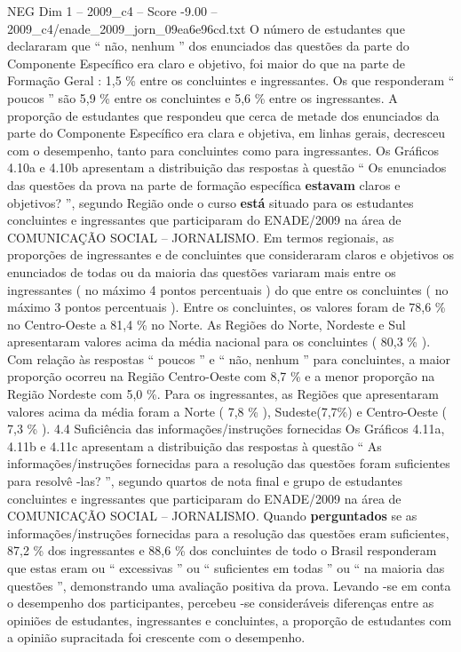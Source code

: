 \begin{textsample}{NEG Dim 1 – 2009\_c4 – Score -9.00 – 2009\_c4/enade\_2009\_jorn\_09ea6e96cd.txt}
O número de estudantes que declararam que “ não, nenhum ” dos enunciados das questões da parte do Componente Específico era claro e objetivo, foi maior do que na parte de Formação Geral : 1,5 \% entre os concluintes e ingressantes.
Os que responderam “ poucos ” são 5,9 \% entre os concluintes e 5,6 \% entre os ingressantes.
A proporção de estudantes que respondeu que cerca de metade dos enunciados da parte do Componente Específico era clara e objetiva, em linhas gerais, decresceu com o desempenho, tanto para concluintes como para ingressantes.
Os Gráficos 4.10a e 4.10b apresentam a distribuição das respostas à questão “ Os enunciados das questões da prova na parte de formação específica \textbf{estavam} claros e objetivos? ”, segundo Região onde o curso \textbf{está} situado para os estudantes concluintes e ingressantes que participaram do ENADE/2009 na área de COMUNICAÇÃO SOCIAL – JORNALISMO.
Em termos regionais, as proporções de ingressantes e de concluintes que consideraram claros e objetivos os enunciados de todas ou da maioria das questões variaram mais entre os ingressantes ( no máximo 4 pontos percentuais ) do que entre os concluintes ( no máximo 3 pontos percentuais ).
Entre os concluintes, os valores foram de 78,6 \% no Centro-Oeste a 81,4 \% no Norte.
As Regiões do Norte, Nordeste e Sul apresentaram valores acima da média nacional para os concluintes ( 80,3 \% ).
Com relação às respostas “ poucos ” e “ não, nenhum ” para concluintes, a maior proporção ocorreu na Região Centro-Oeste com 8,7 \% e a menor proporção na Região Nordeste com 5,0 \%.
Para os ingressantes, as Regiões que apresentaram valores acima da média foram a Norte ( 7,8 \% ), Sudeste(7,7\%) e Centro-Oeste ( 7,3 \% ). 4.4 Suficiência das informações/instruções fornecidas Os Gráficos 4.11a, 4.11b e 4.11c apresentam a distribuição das respostas à questão “ As informações/instruções fornecidas para a resolução das questões foram suficientes para resolvê -las? ”, segundo quartos de nota final e grupo de estudantes concluintes e ingressantes que participaram do ENADE/2009 na área de COMUNICAÇÃO SOCIAL – JORNALISMO.
Quando \textbf{perguntados} se as informações/instruções fornecidas para a resolução das questões eram suficientes, 87,2 \% dos ingressantes e 88,6 \% dos concluintes de todo o Brasil responderam que estas eram ou “ excessivas ” ou “ suficientes em todas ” ou “ na maioria das questões ”, demonstrando uma avaliação positiva da prova.
Levando -se em conta o desempenho dos participantes, percebeu -se consideráveis diferenças entre as opiniões de estudantes, ingressantes e concluintes, a proporção de estudantes com a opinião supracitada foi crescente com o desempenho.

\end{textsample}

